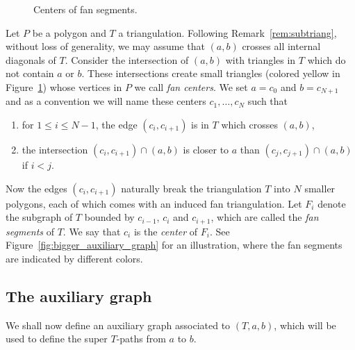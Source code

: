 \documentclass[11pt]{article}
\numberwithin{equation}{section}
\numberwithin{equation}{section}
\begin{document}
\begin{figure}[h]
		\caption{Centers of fan segments.}
		\label{fig:fan_centers}
	\end{figure}


Let $P$ be a polygon and $T$ a triangulation. Following Remark~\ref{rem:subtriang}, without loss of generality, we may assume that
$(a,b)$ crosses all internal diagonals of $T$.
Consider the intersection of $(a,b)$ with triangles in $T$ which do not contain $a$ or $b$.
These intersections create small triangles (colored yellow in Figure~\ref{fig:fan_centers}) whose vertices in $P$ we call \emph{fan centers}.
We set $a=c_0$ and $b=c_{N+1}$ and as a convention we will name these centers $c_1,\dots,c_N$ such that
\begin{enumerate}\itemsep=0pt
 \item[1)] for $1\leq i\leq N-1$, the edge $(c_i,c_{i+1})$ is in $T$ which crosses $(a,b)$,
 \item[2)] the intersection $(c_i,c_{i+1}) \cap (a,b)$ is closer to $a$ than $(c_j,c_{j+1}) \cap (a,b)$ if $i<j$.
\end{enumerate}

Now the edges $(c_i,c_{i+1})$ naturally break the triangulation $T$ into $N$ smaller polygons, each of which
comes with an induced fan triangulation. Let $F_i$ denote the subgraph of $T$ bounded by $c_{i-1}$, $c_{i}$ and $c_{i+1}$,
which are called the \emph{fan segments} of $T$. We say that $c_i$ is the \emph{center} of $F_i$.
 See Figure~\ref{fig:bigger_auxiliary_graph} for an illustration, where the fan segments are indicated by different colors.

\subsection{The auxiliary graph}

We shall now define an auxiliary graph associated to $(T,a,b)$, which will be used to define the super $T$-paths from $a$ to $b$.
	
\end{document}
